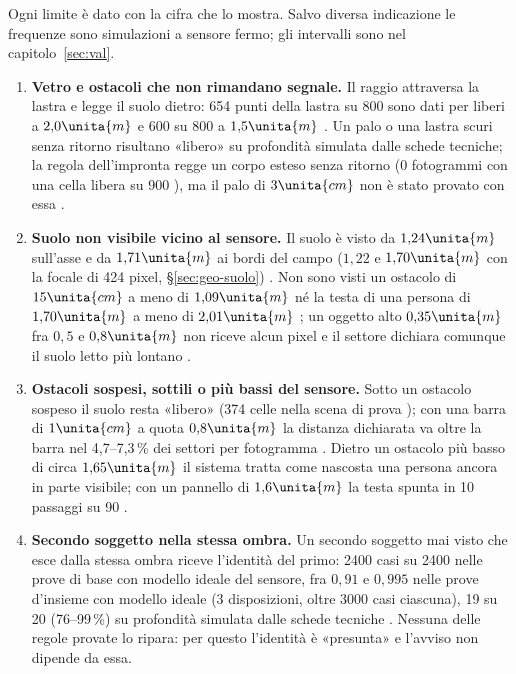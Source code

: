 Ogni limite è dato con la cifra che lo mostra. Salvo diversa indicazione le frequenze sono simulazioni a sensore fermo; gli intervalli sono nel capitolo~\ref{sec:val}.
\begin{enumerate}[label=\arabic*.,ref=\arabic*,leftmargin=1.8em]
\item \textbf{Vetro e ostacoli che non rimandano segnale.} Il raggio attraversa la lastra e legge il suolo dietro: 654 punti della lastra su 800 sono dati per liberi a $2{,}0\unita{m}$ e 600 su 800 a $1{,}5\unita{m}$ . Un palo o una lastra scuri senza ritorno risultano «libero» su profondità simulata dalle schede tecniche; la regola dell'impronta regge un corpo esteso senza ritorno (0 fotogrammi con una cella libera su 900 ), ma il palo di $3\unita{cm}$ non è stato provato con essa .
\item \textbf{Suolo non visibile vicino al sensore.} Il suolo è visto da $1{,}24\unita{m}$ sull'asse e da $1{,}71\unita{m}$ ai bordi del campo ($1{,}22$ e $1{,}70\unita{m}$ con la focale di 424 pixel, \S\ref{sec:geo-suolo}) . Non sono visti un ostacolo di $15\unita{cm}$ a meno di $1{,}09\unita{m}$ né la testa di una persona di $1{,}70\unita{m}$ a meno di $2{,}01\unita{m}$ ; un oggetto alto $0{,}35\unita{m}$ fra $0{,}5$ e $0{,}8\unita{m}$ non riceve alcun pixel e il settore dichiara comunque il suolo letto più lontano .
\item \textbf{Ostacoli sospesi, sottili o più bassi del sensore.} Sotto un ostacolo sospeso il suolo resta «libero» (374 celle nella scena di prova ); con una barra di $1\unita{cm}$ a quota $0{,}8\unita{m}$ la distanza dichiarata va oltre la barra nel 4,7--7,3\,\% dei settori per fotogramma . Dietro un ostacolo più basso di circa $1{,}65\unita{m}$ il sistema tratta come nascosta una persona ancora in parte visibile; con un pannello di $1{,}6\unita{m}$ la testa spunta in 10 passaggi su 90 .
\item \textbf{Secondo soggetto nella stessa ombra.} Un secondo soggetto mai visto che esce dalla stessa ombra riceve l'identità del primo: 2400 casi su 2400 nelle prove di base con modello ideale del sensore, fra $0{,}91$ e $0{,}995$ nelle prove d'insieme con modello ideale (3 disposizioni, oltre 3000 casi ciascuna), 19 su 20 (76--99\,\%) su profondità simulata dalle schede tecniche . Nessuna delle regole provate lo ripara: per questo l'identità è «presunta» e l'avviso non dipende da essa.

\end{enumerate}
